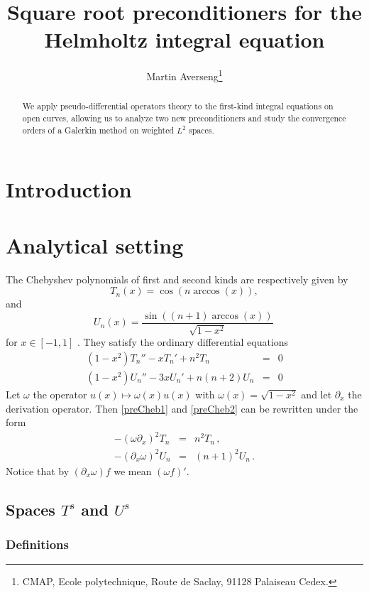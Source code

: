 \documentclass[a4paper]{article}
\title{Square root preconditioners for the Helmholtz integral equation}
\author{Martin Averseng\footnote{CMAP, Ecole polytechnique, Route de Saclay, 91128 Palaiseau Cedex.}}
\begin{document}
\maketitle

\begin{abstract}
	We apply pseudo-differential operators theory to the first-kind integral equations on open curves, allowing us to analyze two new preconditioners and study the convergence orders of a Galerkin method on weighted $L^2$ spaces.  
\end{abstract}

\section*{Introduction}
	
\section{Analytical setting}
\label{sec:analyticalSetting}

The Chebyshev polynomials of first and second kinds are respectively given by
\[T_n(x) = \cos(n \arccos(x)),\]
and 
\[U_n(x) = \dfrac{\sin((n+1) \arccos(x))}{\sqrt{1 - x^2}}\,\]
for $x \in [-1,1]$ \cite{}. They satisfy
the ordinary differential equations
\begin{eqnarray}
	(1-x^2)T_n'' -xT_n' +n^2T_n &=& 0\\\label{preCheb1}
	(1-x^2)U_n'' -3xU_n' +n(n+2)U_n &=&0 \label{preCheb2}
\end{eqnarray}
Let $\omega$ the operator $u(x) \mapsto \omega(x)u(x)$ with $\omega(x) = \sqrt{1 - x^2}$ and let $\partial_x$ the derivation operator. Then \eqref{preCheb1} and \eqref{preCheb2} can be rewritten under the form
\begin{eqnarray}
	-(\omega\partial_x)^2 T_n &=& n^2T_n\,, \label{cheb1}\\
	-(\partial_x\omega)^2 U_n &=& (n+1)^2U_n\, .\label{cheb2}
\end{eqnarray}
Notice that by $(\partial_x\omega) f$ we mean $(\omega f)'$. 

\subsection{Spaces $T^s$ and $U^s$}


\subsubsection{Definitions}
\end{document}
